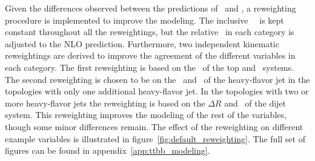 Given the differences observed between the predictions of \PP\ and \ShOL, a reweighting procedure is 
implemented to improve the modeling.
The inclusive \ttbb\ \xsec\ is kept constant throughout all the reweightings, but the 
relative \xsec\ in each category is adjusted to the NLO prediction. 
Furthermore, two independent kinematic reweightings are
derived to improve the agreement of the different variables in each category.  
The first reweighting is based on the \pt\ of the top and \ttbar\ systems.
The second reweighting is chosen to be on the \pt\ and
\eta\ of the heavy-flavor jet in the topologies with only one additional heavy-flavor jet. 
In the topologies with
two or more heavy-flavor jets the reweighting is based on the $\Delta R$ and \pt\ of the 
dijet system. This
reweighting improves the modeling of the rest of the variables, though some minor 
differences remain.
The effect of the reweighting on different example variables is illustrated  in 
figure~\ref{fig:default_reweighting}. The full set of figures can be found in appendix~\ref{app:ttbb_modeling}.
